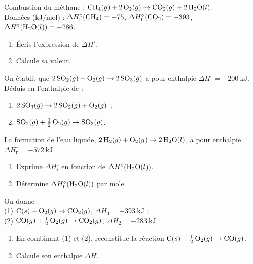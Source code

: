 \documentclass[11pt,a4paper]{article}
\begin{document}
\begin{exo}
Combustion du méthane : $\ce{CH4}(g) + 2\,\ce{O2}(g) \rightarrow \ce{CO2}(g) + 2\,\ce{H2O}(l)$.\\
Données ($\si{\kilo\joule\per\mol}$) : $\Delta H^\circ_{\text{f}}(\ce{CH4})=-75$, \; $\Delta H^\circ_{\text{f}}(\ce{CO2})=-393$, \; $\Delta H^\circ_{\text{f}}(\ce{H2O}(l))=-286$.
\begin{enumerate}[label=\alph*)]
  \item Écris l'expression de $\Delta H^\circ_{\text{r}}$.
  \item Calcule sa valeur.
\end{enumerate}
\end{exo}

\begin{exo}
On établit que $2\,\ce{SO2}(g) + \ce{O2}(g) \rightarrow 2\,\ce{SO3}(g)$ a pour enthalpie $\Delta H^\circ_{\text{r}} = \qty{-200}{\kilo\joule}$. Déduis-en l'enthalpie de :
\begin{enumerate}[label=\alph*)]
  \item $2\,\ce{SO3}(g) \rightarrow 2\,\ce{SO2}(g) + \ce{O2}(g)$ ;
  \item $\ce{SO2}(g) + \tfrac12\,\ce{O2}(g) \rightarrow \ce{SO3}(g)$.
\end{enumerate}
\end{exo}

\begin{exo}
La formation de l'eau liquide, $2\,\ce{H2}(g) + \ce{O2}(g) \rightarrow 2\,\ce{H2O}(l)$, a pour enthalpie $\Delta H^\circ_{\text{r}} = \qty{-572}{\kilo\joule}$.
\begin{enumerate}[label=\alph*)]
  \item Exprime $\Delta H^\circ_{\text{r}}$ en fonction de $\Delta H^\circ_{\text{f}}(\ce{H2O}(l))$.
  \item Détermine $\Delta H^\circ_{\text{f}}(\ce{H2O}(l))$ par mole.
\end{enumerate}
\end{exo}

\begin{exo}
On donne :\\
\hspace*{1em}(1) $\ce{C}(s) + \ce{O2}(g) \rightarrow \ce{CO2}(g)$, \; $\Delta H_1 = \qty{-393}{\kilo\joule}$ ;\\
\hspace*{1em}(2) $\ce{CO}(g) + \tfrac12\,\ce{O2}(g) \rightarrow \ce{CO2}(g)$, \; $\Delta H_2 = \qty{-283}{\kilo\joule}$.
\begin{enumerate}[label=\alph*)]
  \item En combinant (1) et (2), reconstitue la réaction $\ce{C}(s) + \tfrac12\,\ce{O2}(g) \rightarrow \ce{CO}(g)$.
  \item Calcule son enthalpie $\Delta H$.
\end{enumerate}
\end{exo}
\end{document}
